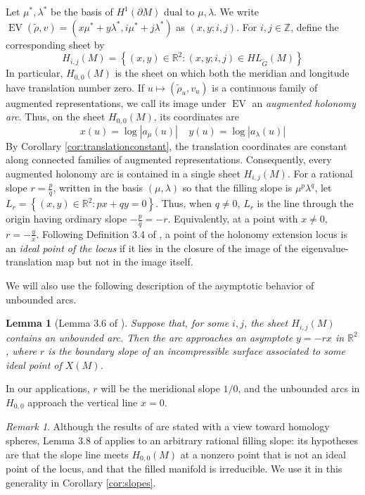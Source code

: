 \documentclass{article}
\theoremstyle{plain}
\theoremstyle{definition}
\theoremstyle{plain}
\theoremstyle{plain}
\theoremstyle{plain}
\newtheorem{lemma}[theorem]{Lemma}
\theoremstyle{remark}
\newtheorem{remark}[theorem]{Remark}
\theoremstyle{remark}
\theoremstyle{plain}
\theoremstyle{plain}
\theoremstyle{plain}
\theoremstyle{plain}
\begin{document}
Let $\mu^*,\lambda^*$ be the basis of $H^1(\partial M)$ dual to $\mu,\lambda$. We write $\operatorname{EV}(\widetilde\rho,v) = \left(x\mu^*+y\lambda^*, i\mu^*+j\lambda^*\right)$ as $(x,y;i,j)$. For $i,j\in\mathbb Z$, define the corresponding sheet by
\begin{equation*}
	H_{i,j}(M) = \left\{(x,y)\in\mathbb R^2: (x,y;i,j)\in HL_{\widetilde G}(M)\right\}
\end{equation*}
In particular, $H_{0,0}(M)$ is the sheet on which both the meridian and longitude have translation number zero. If $u\longmapsto(\widetilde\rho_u,v_u)$ is a continuous family of augmented representations, we call its image under $\operatorname{EV}$ an \emph{augmented holonomy arc}. Thus, on the sheet $H_{0,0}(M)$, its coordinates are
\begin{equation*}
	x(u)=\log|a_\mu(u)| \ \ \ \ \ y(u)=\log|a_\lambda(u)|
\end{equation*}
By Corollary \ref{cor:translationconstant}, the translation coordinates are constant along connected families of augmented representations. Consequently, every augmented holonomy arc is contained in a single sheet $H_{i,j}(M)$. For a rational slope $r=\frac pq$, written in the basis $(\mu,\lambda)$ so that the filling slope is $\mu^p\lambda^q$, let $L_r = \left\{ (x,y)\in\mathbb R^2: px+qy=0 \right\}$. Thus, when $q\neq0$, $L_r$ is the line through the origin having ordinary slope $-\frac pq=-r$. Equivalently, at a point with $x\neq0$, $r=-\frac yx$. Following Definition 3.4 of \cite{gao}, a point of the holonomy extension locus is an \emph{ideal point of the locus} if it lies in the closure of the image of the eigenvalue-translation map but not in the image itself.

\medskip

We will also use the following description of the asymptotic behavior of unbounded arcs.

\begin{lemma}[Lemma 3.6 of {\cite{gao}}]\label{lma:gaoasymptotic}	
Suppose that, for some $i,j$, the sheet $H_{i,j}(M)$ contains an unbounded arc. Then the arc approaches an asymptote $y = -rx$ in $\mathbb{R}^2$, where $r$ is the boundary slope of an incompressible surface associated to some ideal point of $X(M)$. 
\end{lemma}

In our applications, $r$ will be the meridional slope $1/0$, and the unbounded arcs in $H_{0,0}$ approach the vertical line $x = 0$.

\begin{remark}\label{rmk:gaogenerality}
Although the results of \cite{gao} are stated with a view toward homology spheres, Lemma 3.8 of \cite{gao} applies to an arbitrary rational filling slope: its hypotheses are that the slope line meets $H_{0,0}(M)$ at a nonzero point that is not an ideal point of the locus, and that the filled manifold is irreducible. We use it in this generality in Corollary \ref{cor:slopes}.
\end{remark}
\end{document}
